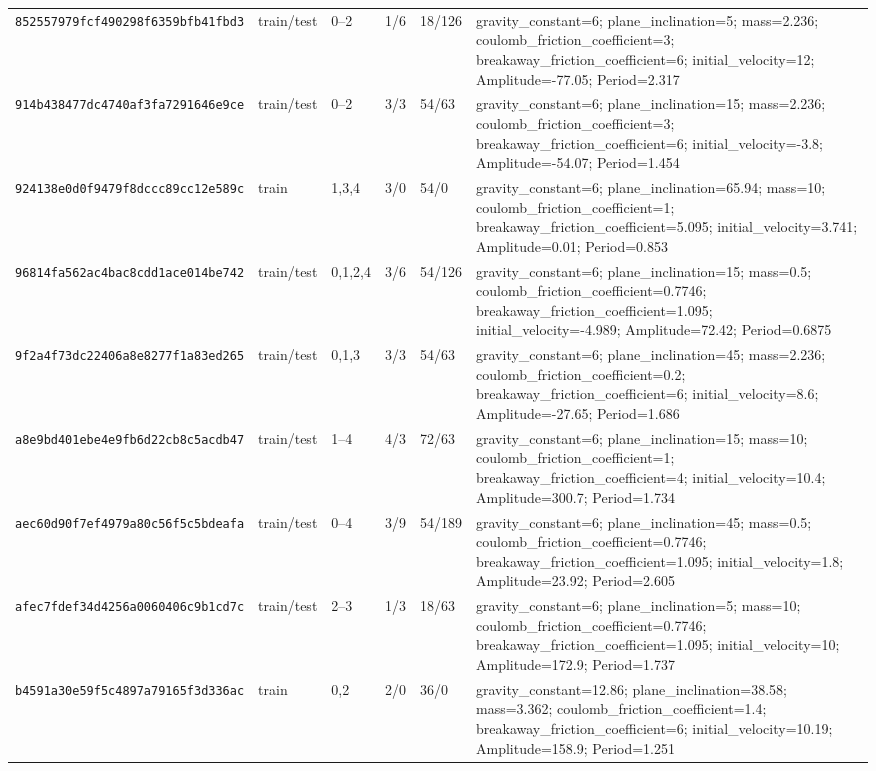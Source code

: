 \begin{tabular*}{\textwidth}{@{\extracolsep{\fill}}llllll@{}}
\texttt{852557979fcf490298f6359bfb41fbd3} & train/test & 0--2 & 1/6 & 18/126 & gravity\_constant=6; plane\_inclination=5; mass=2.236; coulomb\_friction\_coefficient=3; breakaway\_friction\_coefficient=6; initial\_velocity=12; Amplitude=-77.05; Period=2.317 \\
\texttt{914b438477dc4740af3fa7291646e9ce} & train/test & 0--2 & 3/3 & 54/63 & gravity\_constant=6; plane\_inclination=15; mass=2.236; coulomb\_friction\_coefficient=3; breakaway\_friction\_coefficient=6; initial\_velocity=-3.8; Amplitude=-54.07; Period=1.454 \\
\texttt{924138e0d0f9479f8dccc89cc12e589c} & train & 1,3,4 & 3/0 & 54/0 & gravity\_constant=6; plane\_inclination=65.94; mass=10; coulomb\_friction\_coefficient=1; breakaway\_friction\_coefficient=5.095; initial\_velocity=3.741; Amplitude=0.01; Period=0.853 \\
\texttt{96814fa562ac4bac8cdd1ace014be742} & train/test & 0,1,2,4 & 3/6 & 54/126 & gravity\_constant=6; plane\_inclination=15; mass=0.5; coulomb\_friction\_coefficient=0.7746; breakaway\_friction\_coefficient=1.095; initial\_velocity=-4.989; Amplitude=72.42; Period=0.6875 \\
\texttt{9f2a4f73dc22406a8e8277f1a83ed265} & train/test & 0,1,3 & 3/3 & 54/63 & gravity\_constant=6; plane\_inclination=45; mass=2.236; coulomb\_friction\_coefficient=0.2; breakaway\_friction\_coefficient=6; initial\_velocity=8.6; Amplitude=-27.65; Period=1.686 \\
\texttt{a8e9bd401ebe4e9fb6d22cb8c5acdb47} & train/test & 1--4 & 4/3 & 72/63 & gravity\_constant=6; plane\_inclination=15; mass=10; coulomb\_friction\_coefficient=1; breakaway\_friction\_coefficient=4; initial\_velocity=10.4; Amplitude=300.7; Period=1.734 \\
\texttt{aec60d90f7ef4979a80c56f5c5bdeafa} & train/test & 0--4 & 3/9 & 54/189 & gravity\_constant=6; plane\_inclination=45; mass=0.5; coulomb\_friction\_coefficient=0.7746; breakaway\_friction\_coefficient=1.095; initial\_velocity=1.8; Amplitude=23.92; Period=2.605 \\
\texttt{afec7fdef34d4256a0060406c9b1cd7c} & train/test & 2--3 & 1/3 & 18/63 & gravity\_constant=6; plane\_inclination=5; mass=10; coulomb\_friction\_coefficient=0.7746; breakaway\_friction\_coefficient=1.095; initial\_velocity=10; Amplitude=172.9; Period=1.737 \\
\texttt{b4591a30e59f5c4897a79165f3d336ac} & train & 0,2 & 2/0 & 36/0 & gravity\_constant=12.86; plane\_inclination=38.58; mass=3.362; coulomb\_friction\_coefficient=1.4; breakaway\_friction\_coefficient=6; initial\_velocity=10.19; Amplitude=158.9; Period=1.251 \\

\end{tabular*}
